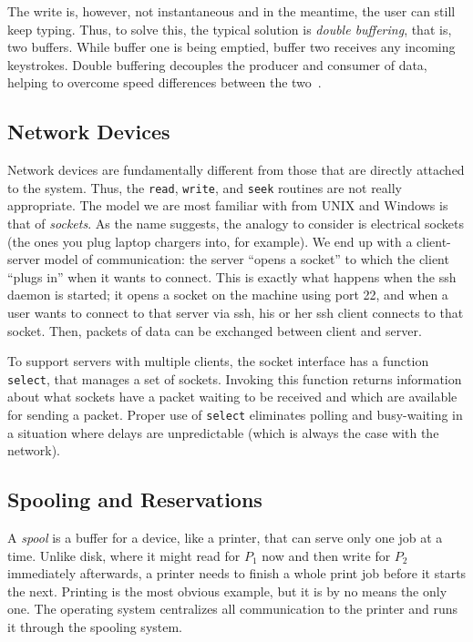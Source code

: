 The write is, however, not instantaneous and in the meantime, the user can still keep typing. Thus, to solve this, the typical solution is \textit{double buffering}, that is, two buffers. While buffer one is being emptied, buffer two receives any incoming keystrokes. Double buffering decouples the producer and consumer of data, helping to overcome speed differences between the two~\cite{osc}.


\subsection*{Network Devices}

Network devices are fundamentally different from those that are directly attached to the system. Thus, the \texttt{read}, \texttt{write}, and \texttt{seek} routines are not really appropriate. The model we are most familiar with from UNIX and Windows is that of \textit{sockets}. As the name suggests, the analogy to consider is electrical sockets (the ones you plug laptop chargers into, for example). We end up with a client-server model of communication: the server ``opens a socket'' to which the client ``plugs in'' when it wants to connect. This is exactly what happens when the ssh daemon is started; it opens a socket on the machine using port 22, and when a user wants to connect to that server via ssh, his or her ssh client connects to that socket. Then, packets of data can be exchanged between client and server.

To support servers with multiple clients, the socket interface has a function \texttt{select}, that manages a set of sockets. Invoking this function returns information about what sockets have a packet waiting to be received and which are available for sending a packet. Proper use of \texttt{select} eliminates polling and busy-waiting in a situation where delays are unpredictable (which is always the case with the network).


\subsection*{Spooling and Reservations}
A \textit{spool} is a buffer for a device, like a printer, that can serve only one job at a time. Unlike disk, where it might read for $P_{1}$ now and then write for $P_{2}$ immediately afterwards, a printer needs to finish a whole print job before it starts the next. Printing is the most obvious example, but it is by no means the only one. The operating system centralizes all communication to the printer and runs it through the spooling system. 

